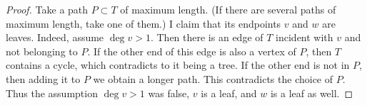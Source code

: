 \begin{proof}
Take a path $P \subset T$ of maximum length.
(If there are several paths of maximum length, take one of them.)
I claim that its endpoints $v$ and $w$ are leaves.
Indeed, assume $\deg v > 1$.
Then there is an edge of $T$ incident with $v$ and not belonging to $P$.
If the other end of this edge is also a vertex of $P$, then $T$ contains a cycle, which contradicts to it being a tree.
If the other end is not in $P$, then adding it to $P$ we obtain a longer path.
This contradicts the choice of $P$.
Thus the assumption $\deg v > 1$ was false, $v$ is a leaf, and $w$ is a leaf as well.
\end{proof}
